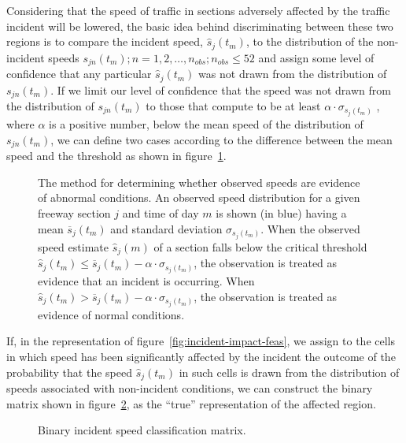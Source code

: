\documentclass[12pt]{report}
\newcommand{\inputTikZ}[1]{%
    \begin{singlespace}
    \end{singlespace}
  }
\newcommand{\inputTikZ}[1]{%
    \begin{singlespace}
    \beginpgfgraphicnamed{#1-external}%
    \endpgfgraphicnamed%
    \end{singlespace}
  }
\newcounter{time}
\newcounter{space}
\begin{document}
Considering that the speed of traffic in sections adversely affected
by the traffic incident will be lowered, the basic idea behind
discriminating between these two regions is to compare the incident
speed, $\hat{s}_j(t_m)$, to the distribution of the non-incident
speeds $s_{jn}(t_m); n = 1,2,\ldots{},n_{obs}; n_{obs}\le 52$ and
assign some level of confidence that any particular $\hat{s}_j(t_m)$
was not drawn from the distribution of $s_{jn}(t_m)$. If we limit our
level of confidence that the speed was not drawn from the distribution
of $s_{jn}(t_m)$ to those that compute to be at least
$\alpha\cdot\sigma_{s_j(t_m)}$ , where $\alpha$ is a positive number,
below the mean speed of the distribution of $s_{jn}(t_m)$, we can
define two cases according to the difference between the mean speed
and the threshold as shown in figure~\ref{fig:incident-speed-case}.
\begin{figure}[t]
  \begin{center}
    \inputTikZ{figs/incident-speed-classification}
    \caption[The method for determining whether observed speeds are
    evidence of abnormal conditions.]{The method for determining whether
      observed speeds are evidence of abnormal conditions.  An observed
      speed distribution for a given freeway section $j$ and time of day
      $m$ is shown (in blue) having a mean $\overline{s}_j(t_m)$ and
      standard deviation $\sigma_{s_j(t_m)}$.  When the observed speed
      estimate $\hat{s}_j(m)$ of a section falls below the critical
      threshold $\hat{s}_j(t_m) \le \overline{s}_j(t_m) -
      \alpha\cdot\sigma_{s_j(t_m)}$, the observation is treated as
      evidence that an incident is occurring.  When $\hat{s}_j(t_m) >
      \overline{s}_j(t_m) - \alpha\cdot\sigma_{s_j(t_m)}$, the
      observation is treated as evidence of normal conditions.}
    \label{fig:incident-speed-case}
  \end{center}
\end{figure}
If, in the representation of figure~\ref{fig:incident-impact-feas}, we
assign to the cells in which speed has been significantly affected by
the incident the outcome of the probability that the speed
$\hat{s}_j(t_m)$ in such cells is drawn from the distribution of speeds
associated with non-incident conditions, we can construct the binary
matrix shown in figure~\ref{fig:incident-speed-classification-binary},
as the ``true'' representation of the affected region.
\begin{figure}[t]
  \begin{center}
    \inputTikZ{figs/time-space-incident-schematic-binary}
    \caption[Binary incident speed classification matrix]{Binary incident speed classification matrix.}
    \label{fig:incident-speed-classification-binary}
  \end{center}
\end{figure}
\end{document}

